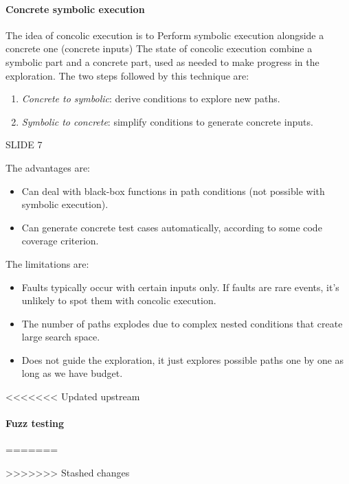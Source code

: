 \paragraph*{Concrete symbolic execution}
The idea of concolic execution is to Perform symbolic execution alongside a concrete one (concrete inputs)
The state of concolic execution combine a symbolic part and a concrete part, used as needed to make progress in the exploration. 
The two steps followed by this technique are: 
\begin{enumerate}
    \item \textit{Concrete to symbolic}: derive conditions to explore new paths. 
    \item \textit{Symbolic to concrete}: simplify conditions to generate concrete inputs. 
\end{enumerate}
\begin{example}
    SLIDE 7
\end{example}
The advantages are: 
\begin{itemize}
    \item Can deal with black-box functions in path conditions (not possible with symbolic execution). 
    \item Can generate concrete test cases automatically, according to some code coverage criterion. 
\end{itemize} 
The limitations are: 
\begin{itemize}
    \item Faults typically occur with certain inputs only. 
        If faults are rare events, it's unlikely to spot them with concolic execution. 
    \item The number of paths explodes due to complex nested conditions that create large search space. 
    \item Does not guide the exploration, it just explores possible paths one by one as long as we have budget. 
\end{itemize}

<<<<<<< Updated upstream
\paragraph*{Fuzz testing}
=======




















>>>>>>> Stashed changes
